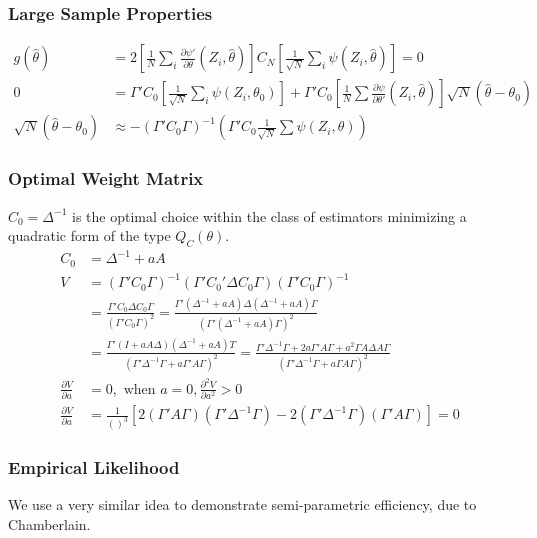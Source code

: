 \documentclass[11pt, a4paper, oneside]{article}
\theoremstyle{definition}
\theoremstyle{proposition}
\theoremstyle{corollary}
\theoremstyle{lemma}
\theoremstyle{theorem}
\begin{document}
\subsubsection{Large Sample Properties}
\begin{align*}
g(\hat{\theta}) &= 2\left[\frac{1}{N}\sum_i\frac{\partial \psi'}{\partial \theta}(Z_i, \hat{\theta})\right]C_N\left[\frac{1}{\sqrt{N}}\sum_i\psi(Z_i, \hat{\theta})\right] =  0\\
0& = \Gamma'C_0\left[\frac{1}{\sqrt{N}}\sum_i\psi(Z_i, \theta_0)\right] + \Gamma'C_0\left[\frac{1}{N}\sum\frac{\partial \psi}{\partial \theta'}(Z_i, \hat{\theta})\right]\sqrt{N}(\hat{\theta}-\theta_0)\\
\sqrt{N}(\hat{\theta}-\theta_0) &\approx -(\Gamma'C_0\Gamma)^{-1}\left(\Gamma'C_0\frac{1}{\sqrt{N}}\sum\psi(Z_i, \theta)\right) 
\end{align*}

\subsubsection{Optimal Weight Matrix}
$C_0 = \Delta^{-1}$ is the optimal choice within the class of estimators minimizing a quadratic form of the type $Q_C(\theta)$. 
\begin{align*}
C_0 & = \Delta^{-1} + aA \\
V &= (\Gamma'C_0\Gamma)^{-1}(\Gamma'C_0'\Delta C_0\Gamma)(\Gamma'C_0\Gamma)^{-1}\\
&=\frac{\Gamma'C_0\Delta C_0\Gamma}{(\Gamma'C_0\Gamma)^2} = \frac{\Gamma'(\Delta^{-1}+aA)\Delta(\Delta^{-1}+aA)\Gamma}{(\Gamma'(\Delta^{-1}+aA)\Gamma)^2} \\
&=\frac{\Gamma'(I+aA\Delta)(\Delta^{-1}+aA)T}{(\Gamma'\Delta^{-1}\Gamma+a\Gamma'A\Gamma)^2} = \frac{\Gamma'\Delta^{-1}\Gamma+2a\Gamma'A\Gamma+a^2\Gamma A \Delta A\Gamma}{(\Gamma'\Delta^{-1}\Gamma+a\Gamma A\Gamma)^2}\\
\frac{\partial V}{\partial a} &= 0, \text{ when } a = 0, \frac{\partial^2 V}{\partial a^2}>0 \\
\frac{\partial V}{\partial a} & = \frac{1}{()^3}[2(\Gamma'A\Gamma)(\Gamma'\Delta^{-1}\Gamma) - 2(\Gamma'\Delta^{-1}\Gamma)(\Gamma'A\Gamma)] = 0
\end{align*}

\subsubsection{Empirical Likelihood}
We use a very similar idea to demonstrate semi-parametric efficiency, due to Chamberlain. 
\end{document}
